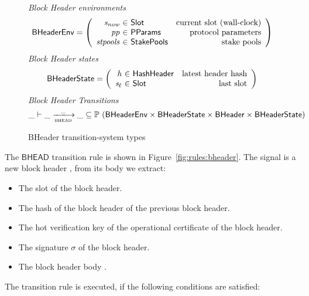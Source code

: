 \begin{figure}
  \emph{Block Header environments}
  \begin{equation*}
    \BHeaderEnv =
    \left(
      \begin{array}{r@{~\in~}lr}
        \var{s_{now}} & \Slot & \text{current slot (wall-clock)} \\
        \var{pp} & \PParams & \text{protocol parameters} \\
        \var{stpools} & \StakePools & \text{stake pools} \\
      \end{array}
    \right)
  \end{equation*}
  \emph{Block Header states}
  \begin{equation*}
    \BHeaderState =
    \left(
      \begin{array}{r@{~\in~}lr}
        \var{h} & \HashHeader & \text{latest header hash} \\
        \var{s_\ell} & \Slot & \text{last slot} \\
      \end{array}
    \right)
  \end{equation*}
  \emph{Block Header Transitions}
  \begin{equation*}
    \_ \vdash \var{\_} \trans{bhead}{\_} \var{\_} \subseteq
    \powerset (\BHeaderEnv \times \BHeaderState \times \BHeader \times \BHeaderState)
  \end{equation*}
  \caption{BHeader transition-system types}
  \label{fig:ts-types:bheader}
\end{figure}

The $\mathsf{BHEAD}$ transition rule is shown in
Figure~\ref{fig:rules:bheader}. The signal is a new block header , from
its body  we extract:

\begin{itemize}
\item The slot  of the block header.
\item The hash of the block header  of the previous block header.
\item The hot verification key  of the operational certificate of
  the block header.
\item The signature $\sigma$ of the block header.
\item The block header body .
\end{itemize}

The transition rule is executed, if the following conditions are satisfied:

